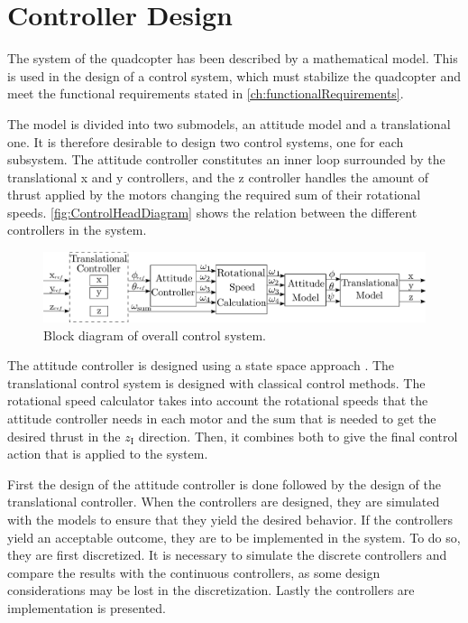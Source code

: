 \chapter{Controller Design}\label{chap:Control}
The system of the quadcopter has been described by a mathematical model. This is used in the design of a control system, which must stabilize the quadcopter and meet the functional requirements stated in \autoref{ch:functionalRequirements}.

The model is divided into two submodels, an attitude model and a translational one. It is therefore desirable to design two control systems, one for each subsystem. The attitude controller constitutes an inner loop surrounded by the translational x and y controllers, and the z controller handles the amount of thrust applied by the motors changing the required sum of their rotational speeds. \autoref{fig:ControlHeadDiagram} shows the relation between the different controllers in the system.
%
\begin{figure}[H]
	\centering
	\includegraphics[width=1 \textwidth]{figures/generalcontroldiagram}
	\caption{Block diagram of overall control system.}
	\label{fig:ControlHeadDiagram}
\end{figure}

The attitude controller is designed using a state space approach  \cite{ssReference}. The translational control system is designed with classical control methods. The rotational speed calculator takes into account the rotational speeds that the attitude controller needs in each motor and the sum that is needed to get the desired thrust in the $z_\mathrm{I}$ direction. Then, it combines both to give the final control action that is applied to the system.

First the design of the attitude controller is done followed by the design of the translational controller. When the controllers are designed, they are simulated with the models to ensure that they yield the desired behavior. If the controllers yield an acceptable outcome, they are to be implemented in the system. To do so, they are first discretized. It is necessary to simulate the discrete controllers and compare the results with the continuous controllers, as some design considerations may be lost in the discretization. Lastly the controllers are implementation is presented. 
